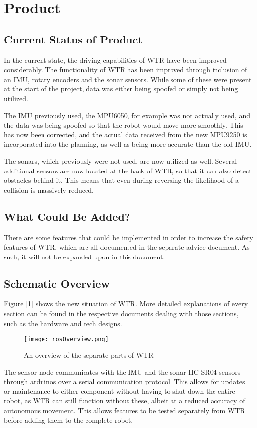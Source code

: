 \section{Product}
\subsection{Current Status of Product}
In the current state, the driving capabilities of WTR have been improved considerably.
The functionality of WTR has been improved through inclusion of an IMU, rotary encoders and the sonar sensors.
While some of these were present at the start of the project, data was either being spoofed or simply not being utilized.

The IMU previously used, the MPU6050, for example was not actually used, and the data was being spoofed so that the robot would move more smoothly.
This has now been corrected, and the actual data received from the new MPU9250 is incorporated into the planning, as well as being more accurate than the old IMU.

The sonars, which previously were not used, are now utilized as well.
Several additional sensors are now located at the back of WTR, so that it can also detect obstacles behind it.
This means that even during reversing the likelihood of a collision is massively reduced.

\subsection{What Could Be Added?}
There are some features that could be implemented in order to increase the safety features of WTR, which are all documented in the separate advice document.
As such, it will not be expanded upon in this document.

\subsection{Schematic Overview}
Figure [\ref{fig::schemView}] shows the new situation of WTR.
More detailed explanations of every section can be found in the respective documents dealing with those sections, such as the hardware and tech designs.
\begin{figure}[H]
\centering
\texttt{[image: rosOverview.png]}
\caption{An overview of the separate parts of WTR}
\label{fig::schemView}
\end{figure}

The sensor node communicates with the IMU and the sonar HC-SR04 sensors through arduinos over a serial communication protocol.
This allows for updates or maintenance to either component without having to shut down the entire robot, as WTR can still function without these, albeit at a reduced accuracy of autonomous movement.
This allows features to be tested separately from WTR before adding them to the complete robot.

